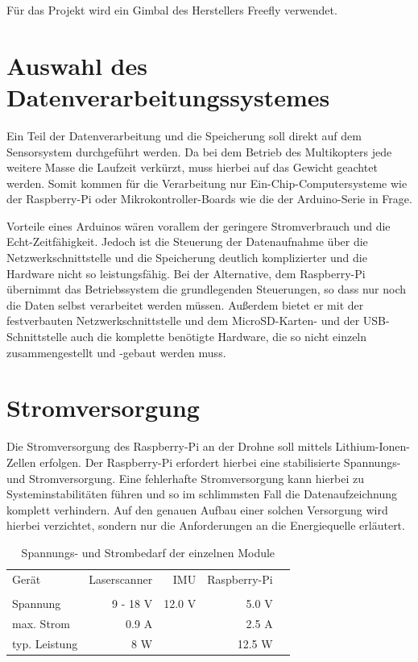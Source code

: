 \documentclass[a4paper,12pt,bibliography=totoc, listof=totoc,titlepage]{scrreprt}
\begin{document}
Für das Projekt wird ein Gimbal des Herstellers Freefly verwendet. 


\section{Auswahl des Datenverarbeitungssystemes}

Ein Teil der Datenverarbeitung und die Speicherung soll direkt auf dem Sensorsystem durchgeführt werden. Da bei dem Betrieb des Multikopters jede weitere Masse die Laufzeit verkürzt, muss hierbei auf das Gewicht geachtet werden. Somit kommen für die Verarbeitung nur Ein-Chip-Computersysteme wie der Raspberry-Pi oder Mikrokontroller-Boards wie die der Arduino-Serie in Frage. 

Vorteile eines Arduinos wären vorallem der geringere Stromverbrauch und die Echt-Zeitfähigkeit. Jedoch ist die Steuerung der Datenaufnahme über die Netzwerkschnittstelle und die Speicherung deutlich komplizierter und die Hardware nicht so leistungsfähig. Bei der Alternative, dem Raspberry-Pi übernimmt das Betriebssystem die grundlegenden Steuerungen, so dass nur noch die Daten selbst verarbeitet werden müssen. Außerdem bietet er mit der festverbauten Netzwerkschnittstelle und dem MicroSD-Karten- und der USB-Schnittstelle auch die komplette benötigte Hardware, die so nicht einzeln zusammengestellt und -gebaut werden muss.


\section{Stromversorgung}
Die Stromversorgung des Raspberry-Pi an der Drohne soll mittels Lithium-Ionen-Zellen erfolgen. Der Raspberry-Pi erfordert hierbei eine stabilisierte Spannungs- und Stromversorgung. Eine fehlerhafte Stromversorgung kann hierbei zu Systeminstabilitäten führen und so im schlimmsten Fall die Datenaufzeichnung komplett verhindern. Auf den genauen Aufbau einer solchen Versorgung wird hierbei verzichtet, sondern nur die Anforderungen an die Energiequelle erläutert.

\begin{table}
\begin{tabular}{ l | r | r | r | r }
  Gerät 	& Laserscanner	& IMU		& Raspberry-Pi\\
		& \citep{vlpSheet} &		& \citep{raspSheet}	\\
  \hline
  Spannung 	& 9 - 18 V 	&	12.0 V	& 5.0 V \\
  \hline
  max. Strom 	& 0.9 A		&		& 2.5 A \\
  \hline
  typ. Leistung	& 8 W		& 		& 12.5 W 
\end{tabular}
\caption{Spannungs- und Strombedarf der einzelnen Module}
\label{tab:strom}
\end{table}
\end{document}
